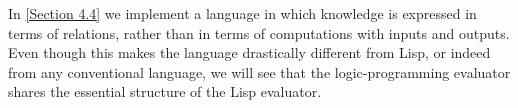In \cref{Section 4.4} we implement a  language in which knowledge is expressed in terms of relations, rather than in terms of computations with inputs and outputs.
Even though this makes the language drastically different from Lisp, or indeed from any conventional language, we will see that the logic-programming evaluator shares the essential structure of the Lisp evaluator.











